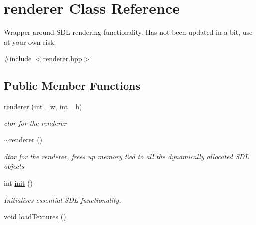 \hypertarget{classrenderer}{\section{renderer Class Reference}
\label{classrenderer}
}


Wrapper around S\-D\-L rendering functionality. Has not been updated in a bit, use at your own risk.  




{\ttfamily \#include $<$renderer.\-hpp$>$}

\subsection*{Public Member Functions}
\begin{DoxyCompactItemize}
\item 
\hyperlink{classrenderer_ab24dfda8eda699409c6f64eaa3d3d681}{renderer} (int \-\_\-w, int \-\_\-h)
\begin{DoxyCompactList}\small\item\em ctor for the renderer \end{DoxyCompactList}\item 
\hypertarget{classrenderer_a5c7f1cfc1cd1292c2ec8519dacdce0a6}{\hyperlink{classrenderer_a5c7f1cfc1cd1292c2ec8519dacdce0a6}{$\sim$renderer} ()}\label{classrenderer_a5c7f1cfc1cd1292c2ec8519dacdce0a6}

\begin{DoxyCompactList}\small\item\em dtor for the renderer, frees up memory tied to all the dynamically allocated S\-D\-L objects \end{DoxyCompactList}\item 
\hypertarget{classrenderer_a92f72123ee07357e08173e8eea641ad4}{int \hyperlink{classrenderer_a92f72123ee07357e08173e8eea641ad4}{init} ()}\label{classrenderer_a92f72123ee07357e08173e8eea641ad4}

\begin{DoxyCompactList}\small\item\em Initialises essential S\-D\-L functionality. \end{DoxyCompactList}\item 
\hypertarget{classrenderer_a025d4becc60b9ef886b7f0fee06d015a}{void \hyperlink{classrenderer_a025d4becc60b9ef886b7f0fee06d015a}{load\-Textures} ()}\label{classrenderer_a025d4becc60b9ef886b7f0fee06d015a}


\end{DoxyCompactItemize}
